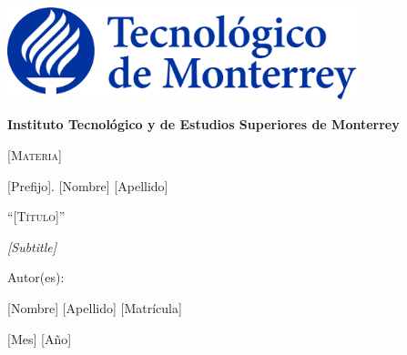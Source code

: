 \documentclass[11pt]{exam}
\begin{document}
    \begin{titlepage}
        \centering
        {\includegraphics[width = 4in]{pictures/itesm-logo.png}\par}
        \vspace{0.4in}
        {\bfseries\LARGE Instituto Tecnol\'ogico y de Estudios Superiores de Monterrey \par}
        \vspace{0.4in}
        {\scshape\Large [Materia] \par}
        {\Large [Prefijo]. [Nombre] [Apellido] \par}
        \vspace{1.2in}
        {\scshape\Large ``[T\'itulo]'' \par}
        \vspace{1.2in}
        {\itshape\Large [Subtitle] \par}
        \vfill
        {\Large Autor(es): \par}
        {\Large [Nombre] [Apellido] [Matrícula] \par}
        \vfill
        {\Large [Mes] [Año] \par}
    \end{titlepage}

    \headrule
    \footrule
\end{document}
